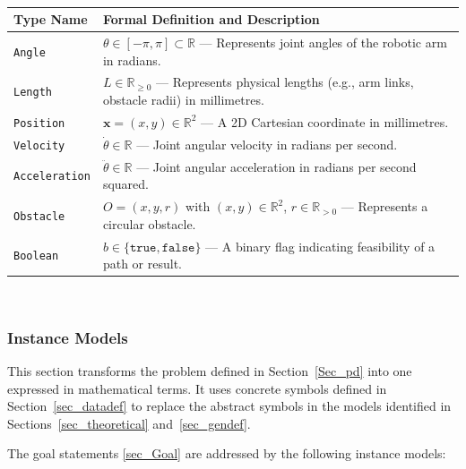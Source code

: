 \documentclass[12pt]{article}
\newcommand{\colAwidth}{0.13\textwidth}
\newcommand{\colBwidth}{0.82\textwidth}
\begin{document}
~\newline

\noindent
\begin{minipage}{\textwidth}
\renewcommand*{\arraystretch}{1.5}
\begin{tabular}{| p{\colAwidth} | p{\colBwidth}|}
  \hline
  \rowcolor[gray]{0.9}
  \textbf{Type Name} & \textbf{Formal Definition and Description} \\
  \hline
  \texttt{Angle} & $\theta \in [-\pi, \pi] \subset \mathbb{R}$ — Represents joint angles of the robotic arm in radians. \\
  \hline
  \texttt{Length} & $L \in \mathbb{R}_{\ge 0}$ — Represents physical lengths (e.g., arm links, obstacle radii) in millimetres. \\
  \hline
  \texttt{Position} & $\mathbf{x} = (x, y) \in \mathbb{R}^2$ — A 2D Cartesian coordinate in millimetres. \\
  \hline
  \texttt{Velocity} & $\dot{\theta} \in \mathbb{R}$ — Joint angular velocity in radians per second. \\
  \hline
  \texttt{Acceleration} & $\ddot{\theta} \in \mathbb{R}$ — Joint angular acceleration in radians per second squared. \\
  \hline
  \texttt{Obstacle} & $O = (x, y, r)$ with $(x, y) \in \mathbb{R}^2$, $r \in \mathbb{R}_{>0}$ — Represents a circular obstacle. \\
  \hline
  \texttt{Boolean} & $b \in \{\texttt{true}, \texttt{false}\}$ — A binary flag indicating feasibility of a path or result. \\
  \hline
\end{tabular}
\end{minipage}\\



\subsubsection{Instance Models} \label{sec_instance}

This section transforms the problem defined in Section~\ref{Sec_pd} into one expressed in mathematical terms. It uses concrete symbols defined in Section~\ref{sec_datadef} to replace the abstract symbols in the models identified in Sections~\ref{sec_theoretical} and~\ref{sec_gendef}.

The goal statements \ref{sec_Goal} are addressed by the following instance models:

~\newline
\end{document}
